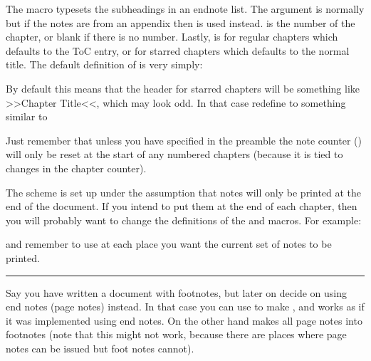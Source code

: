 The macro \cmd{\pagenotesubhead} typesets the subheadings in an
endnote list.  The  argument is normally
\cmd{\chaptername} but if the notes are from an appendix then
\cmd{\appendixname} is used instead.  is the number of the
chapter, or blank if there is no number. Lastly,  is
\cmd{\pnchap} for regular chapters which defaults to the ToC entry, or
\cmd{\pnschap} for starred chapters which defaults to the normal
title. The default definition of \cmd{\pagenotesubhead} is very
simply:
\begin{lcode}
\newcommand*{\pagenotesubhead}[3]{%
  \section*{#1 #2 #3}}
\newcommand\pagenotesubheadstarred{\pagenotesubhead} %
\end{lcode}
By default this means that the header for starred chapters will be
something like >>Chapter Title<<, which may look odd. In that case
redefine \cmd{\pagenotesubheadstarred} to something similar to 
\begin{lcode}
\renewcommand\pagenotesubheadstarred[3]{\section*{#3}}
\end{lcode}
Just remember that unless you have specified \cmd{\continuousnotenums}
in the preamble the note counter () will only be reset
at the start of any numbered chapters (because it is tied to changes
in the chapter counter).

The scheme is set up under the assumption that notes will only be
printed at the end of the document. If you intend to put them at the
end of each chapter, then you will probably want to change the
definitions of the \cmd{\notedivision} and \cmd{\pagenotesubhead}
macros. For example:
\begin{lcode}
\renewcommand*{\notedivision}{\section*{\notesname}}
\renewcommand*{\pagenotesubhead}[3]{}
\end{lcode}
and remember to use \cmd{\printpagenotes*} at each place you want the
current set of notes to be printed.

\fancybreak{}

Say you have written a document with footnotes, but later on decide on
using end notes (page notes) instead. In that case you can use
\cmd{\foottopagenote} to make \cmd{\footnote}, \cmd{\footnotemark} and
\cmd{\footnotetext} works as if it was implemented using end notes. On
the other hand \cmd{\pagetofootnote} makes all  page notes into
footnotes (note that this might not work, because there are places
where page notes can be issued but foot notes cannot).

